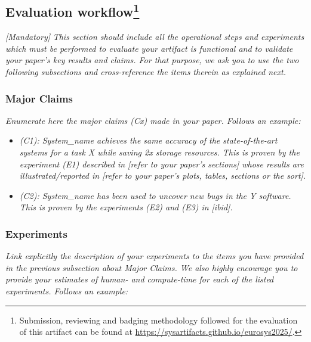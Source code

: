 \subsection{Evaluation workflow\footnote{
Submission, reviewing and badging methodology followed for the evaluation of this artifact can be found at \url{https://sysartifacts.github.io/eurosys2025/}.}}
{\em [Mandatory]} \textit{This section should include all the operational steps and experiments which must be performed to evaluate your artifact is functional and to validate your paper's key results and claims. For that purpose, we ask you to use the two following subsections and cross-reference the items therein as explained next.}

\subsubsection{Major Claims}
\textit{Enumerate here the major claims (Cx) made in your paper. Follows an example:}\\

\begin{itemize}
    \item \textit{(C1): System\_name achieves the same accuracy of the state-of-the-art systems for a task X while saving 2x storage resources. This is proven by the experiment (E1) described in [refer to your paper's sections] whose results are illustrated/reported in [refer to your paper's plots, tables, sections or the sort].}
    \item \textit{(C2): System\_name has been used to uncover new bugs in the Y software. This is proven by the experiments (E2) and (E3) in [ibid].}
\end{itemize}

\subsubsection{Experiments}
\textit{Link explicitly the description of your experiments to the items you have provided in the previous subsection about Major Claims. We also highly encourage you to provide your estimates of human- and compute-time for each of the listed experiments. Follows an example:}
~\\

